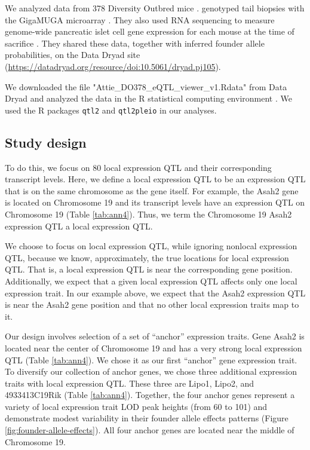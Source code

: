 \documentclass{article}
\begin{document}
We analyzed data from 378 Diversity Outbred mice \citep{keller2018genetic}. \citet{keller2018genetic} genotyped tail biopsies with the GigaMUGA microarray \citep{morgan2016mouse}. They also used RNA sequencing to measure genome-wide pancreatic islet cell gene expression for each mouse at the time of sacrifice \citep{keller2018genetic}. They shared these data, together with inferred founder allele probabilities, on the Data Dryad site (\url{https://datadryad.org/resource/doi:10.5061/dryad.pj105}). 

We downloaded the file "Attie\_DO378\_eQTL\_viewer\_v1.Rdata" from Data Dryad \citep{keller2018genetic} and analyzed the data in the R statistical computing environment \citep{r}. We used the R packages \texttt{qtl2} \citep{broman2018} and \texttt{qtl2pleio} \citep{qtl2pleio} in our analyses. 

\subsection{Study design}

To do this, we focus on 80 local expression QTL and their corresponding transcript levels. Here, we define a local expression QTL to be an expression QTL that is on the same chromosome as the gene itself. For example, the Asah2 gene is located on Chromosome 19 and its transcript levels have an expression QTL on Chromosome 19 (Table \ref{tab:ann4}). Thus, we term the Chromosome 19 Asah2 expression QTL a local expression QTL. 

We choose to focus on local expression QTL, while ignoring nonlocal expression QTL, because we know, approximately, the true locations for local expression QTL. That is, a local expression QTL is near the corresponding gene position. Additionally, we expect that a given local expression QTL affects only one local expression trait. In our example above, we expect that the Asah2 expression QTL is near the Asah2 gene position and that no other local expression traits map to it.


Our design involves selection of a set of ``anchor'' expression traits. Gene Asah2 is located near the center of Chromosome 19 and has a very strong local expression QTL (Table \ref{tab:ann4}). We chose it as our first ``anchor'' gene expression trait. To diversify our collection of anchor genes, we chose three additional expression traits with local expression QTL. These three are Lipo1, Lipo2, and 4933413C19Rik (Table \ref{tab:ann4}). Together, the four anchor genes represent a variety of local expression trait LOD peak heights (from 60 to 101) and demonstrate modest variability in their founder allele effects patterns (Figure \ref{fig:founder-allele-effects}). All four anchor genes are located near the middle of Chromosome 19.  
\end{document}
